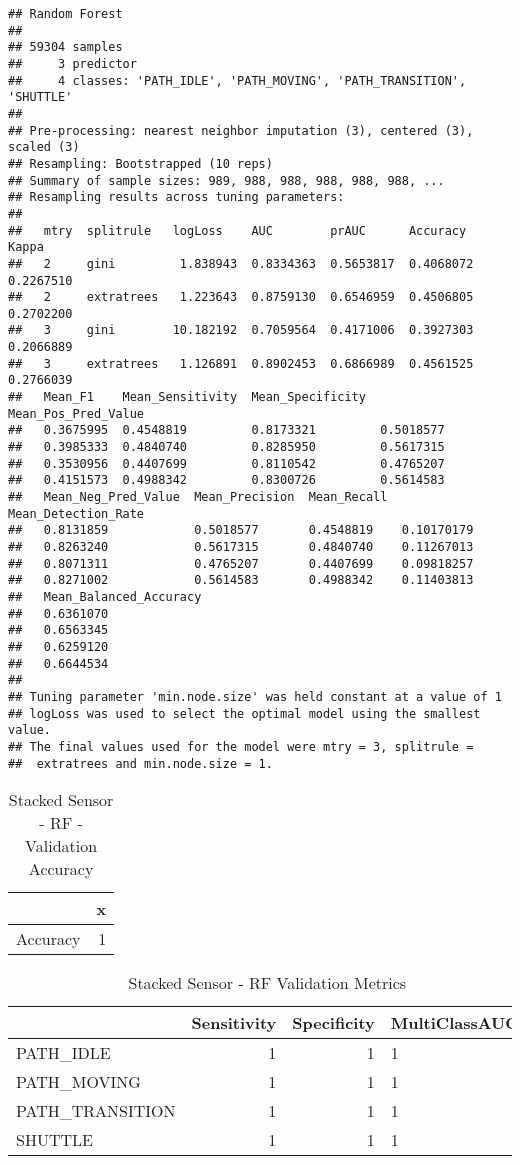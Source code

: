 \documentclass[]{article}
\begin{document}
\begin{verbatim}
## Random Forest 
## 
## 59304 samples
##     3 predictor
##     4 classes: 'PATH_IDLE', 'PATH_MOVING', 'PATH_TRANSITION', 'SHUTTLE' 
## 
## Pre-processing: nearest neighbor imputation (3), centered (3), scaled (3) 
## Resampling: Bootstrapped (10 reps) 
## Summary of sample sizes: 989, 988, 988, 988, 988, 988, ... 
## Resampling results across tuning parameters:
## 
##   mtry  splitrule   logLoss    AUC        prAUC      Accuracy   Kappa    
##   2     gini         1.838943  0.8334363  0.5653817  0.4068072  0.2267510
##   2     extratrees   1.223643  0.8759130  0.6546959  0.4506805  0.2702200
##   3     gini        10.182192  0.7059564  0.4171006  0.3927303  0.2066889
##   3     extratrees   1.126891  0.8902453  0.6866989  0.4561525  0.2766039
##   Mean_F1    Mean_Sensitivity  Mean_Specificity  Mean_Pos_Pred_Value
##   0.3675995  0.4548819         0.8173321         0.5018577          
##   0.3985333  0.4840740         0.8285950         0.5617315          
##   0.3530956  0.4407699         0.8110542         0.4765207          
##   0.4151573  0.4988342         0.8300726         0.5614583          
##   Mean_Neg_Pred_Value  Mean_Precision  Mean_Recall  Mean_Detection_Rate
##   0.8131859            0.5018577       0.4548819    0.10170179         
##   0.8263240            0.5617315       0.4840740    0.11267013         
##   0.8071311            0.4765207       0.4407699    0.09818257         
##   0.8271002            0.5614583       0.4988342    0.11403813         
##   Mean_Balanced_Accuracy
##   0.6361070             
##   0.6563345             
##   0.6259120             
##   0.6644534             
## 
## Tuning parameter 'min.node.size' was held constant at a value of 1
## logLoss was used to select the optimal model using the smallest value.
## The final values used for the model were mtry = 3, splitrule =
##  extratrees and min.node.size = 1.
\end{verbatim}

\begin{table}[!h]

\caption{\label{tab:3g-stacked-sensor-rf-results}Stacked Sensor - RF - Validation Accuracy}
\centering
\begin{tabular}[t]{lr}
\toprule
  & x\\
\midrule
Accuracy & 1\\
\bottomrule
\end{tabular}
\end{table}

\begin{table}[!h]

\caption{\label{tab:3g-stacked-sensor-rf-results}Stacked Sensor - RF Validation Metrics}
\centering
\begin{tabular}[t]{lrrl}
\toprule
  & Sensitivity & Specificity & MultiClassAUC\\
\midrule
PATH\_IDLE & 1 & 1 & 1\\
PATH\_MOVING & 1 & 1 & 1\\
PATH\_TRANSITION & 1 & 1 & 1\\
SHUTTLE & 1 & 1 & 1\\
\bottomrule
\end{tabular}
\end{table}
\end{document}
